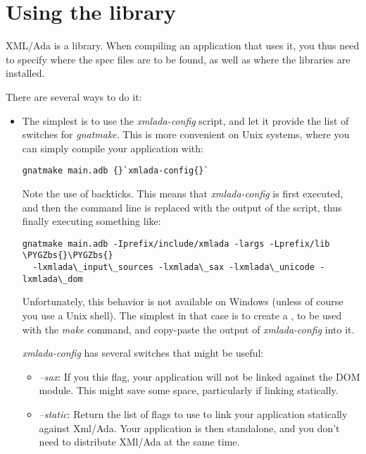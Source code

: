 \documentclass[letterpaper,10pt,english]{sphinxmanual}
\def\PYGZbs{\char`\\}
\begin{document}
\chapter{Using the library}
\label{using::doc}\label{using:using-the-library}\label{using:id1}
XML/Ada is a library. When compiling an application that uses it, you
thus need to specify where the spec files are to be found, as well
as where the libraries are installed.

There are several ways to do it:

\begin{itemize}
\item {} 
The simplest is to use the \emph{xmlada-config} script, and let it
provide the list of switches for \emph{gnatmake}. This is more
convenient on Unix systems, where you can simply compile your application
with:

\begin{Verbatim}[commandchars=\\\{\}]
gnatmake main.adb {}`xmlada-config{}`
\end{Verbatim}

Note the use of backticks. This means that \emph{xmlada-config} is
first executed, and then the command line is replaced with the output of
the script, thus finally executing something like:

\begin{Verbatim}[commandchars=\\\{\}]
gnatmake main.adb -Iprefix/include/xmlada -largs -Lprefix/lib \PYGZbs{}\PYGZbs{}
  -lxmlada\_input\_sources -lxmlada\_sax -lxmlada\_unicode -lxmlada\_dom
\end{Verbatim}

Unfortunately, this behavior is not available on Windows (unless of course
you use a Unix shell). The simplest in that case is to create a
, to be used with the \emph{make} command, and copy-paste
the output of \emph{xmlada-config} into it.

\emph{xmlada-config} has several switches that might be useful:
\begin{itemize}
\item {} 
\emph{--sax}: If you this flag, your application will not be
linked against the DOM module. This might save some space, particularly
if linking statically.

\item {} 
\emph{--static}: Return the list of flags to use to link your
application statically against Xml/Ada. Your application is then
standalone, and you don't need to distribute XMl/Ada at the same time.


\end{itemize}
\end{itemize}
\end{document}
